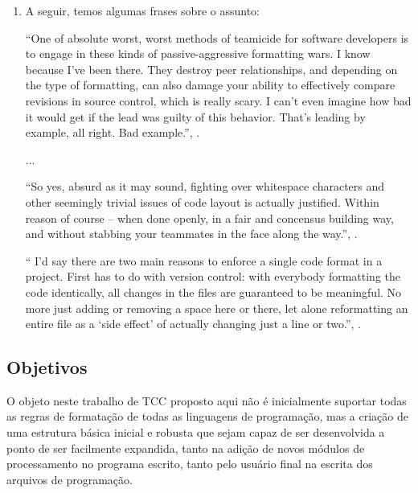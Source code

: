 {\begin{enumerate}[leftmargin=*]
        \item

        A seguir, temos algumas frases sobre o assunto:

        \begin{myquote}
        ``One of absolute worst, worst methods of teamicide for software developers is to engage
        in these kinds of passive-aggressive formatting wars. I know because I've been there.
        They destroy peer relationships, and depending on the type of formatting, can also damage
        your ability to effectively compare revisions in source control, which is really scary.
        I can't even imagine how bad it would get if the lead was guilty of this behavior. That's
        leading by example, all right. Bad example.'', \cite{Atwood}.
        \end{myquote}
        \vspace{-5mm}
        ...
        \begin{myquote}
        ``So yes, absurd as it may sound, fighting over whitespace characters and other seemingly
        trivial issues of code layout is actually justified. Within reason of course -- when done
        openly, in a fair and concensus building way, and without stabbing your teammates in the
        face along the way.'', \cite{Atwood}.
        \end{myquote}

        \begin{myquote}``
        I'd say there are two main reasons to enforce a single code format in a project. First has
        to do with version control: with everybody formatting the code identically, all changes in
        the files are guaranteed to be meaningful. No more just adding or removing a space here or
        there, let alone reformatting an entire file as a `side effect' of actually changing just a
        line or two.'', \cite{Geukens}.
        \end{myquote}

    \end{enumerate}



\subsection{Objetivos}

    O objeto neste trabalho de TCC proposto aqui não é inicialmente suportar todas as regras de
    formatação de todas as linguagens de programação, mas a criação de uma estrutura básica inicial
    e robusta que sejam capaz de ser desenvolvida a ponto de ser facilmente expandida, tanto na
    adição de novos módulos de processamento no programa escrito, tanto pelo usuário final na
    escrita dos arquivos de programação.

}
